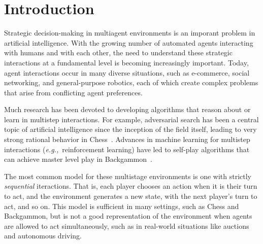 \documentclass[preprint,12pt]{elsarticle}
\newcommand{\eg}{{\it e.g.,}~}
\begin{document}




\section{Introduction}
\label{sec:intro}

Strategic decision-making in multiagent environments is an imporant problem in artificial intelligence. 
With the growing number of automated agents interacting with humans and with each other, the need to 
understand these strategic interactions at a fundamental level is becoming increasingly important. 
Today, agent interactions occur in many diverse situations, such as e-commerce, social networking, and 
general-purpose robotics, each of which create complex problems that arise from conflicting agent 
preferences. 

Much research has been devoted to developing algorithms that reason about or learn in multistep 
interactions. For example, adversarial search has been a central topic of artificial intelligence 
since the inception of the field itself, leading to very strong rational behavior in 
Chess~\cite{Campbell02deepblue}. Advances in machine learning for multistep interactions 
(\eg reinforcement learning) have led to self-play algorithms that can achieve master level play 
in Backgammon~\cite{Tesauro95TDGammon}. 

The most common model for these multistage environments is one with strictly {\it sequential} 
iteractions. That is, each player chooses an action when it is their turn to act, and the environment 
generates a new state, with the next player's turn to act, and so on. This model is sufficient in many 
settings, such as Chess and Backgammon, but is not a good representation of the environment when agents 
are allowed to act simultaneously, such as in real-world situations like auctions and autonomous driving. 
\end{document}

